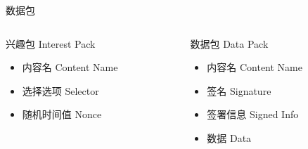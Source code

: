 \documentclass[mathserif]{beamer}
\begin{document}
\begin{frame}{数据包}
  \begin{columns}
    \begin{column}[t]{0.5\textwidth}
      兴趣包 Interest Pack
      \begin{itemize}
      \item 内容名 Content Name
      \item 选择选项 Selector
      \item 随机时间值 Nonce
      \end{itemize}
    \end{column}

    \begin{column}[t]{0.5\textwidth}
      数据包 Data Pack
      \begin{itemize}
      \item 内容名 Content Name
      \item 签名 Signature
      \item 签署信息 Signed Info
      \item 数据 Data
      \end{itemize}
    \end{column}
  \end{columns}
\end{frame}
\end{document}
